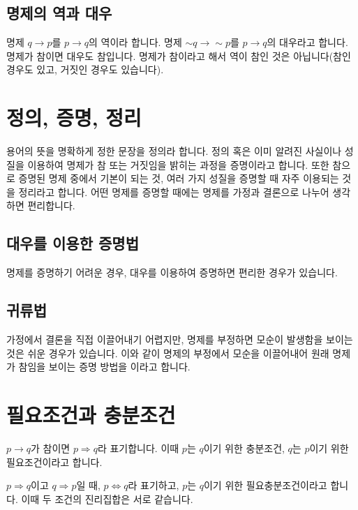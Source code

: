 \subsection{명제의 역과 대우}
명제 $q \longrightarrow p$를 $p \longrightarrow q$의 역이라 합니다. 명제 $\sim q \longrightarrow \sim p$를 $p \longrightarrow q$의 대우라고 합니다. 명제가 참이면 대우도 참입니다. 명제가 참이라고 해서 역이 참인 것은 아닙니다(참인 경우도 있고, 거짓인 경우도 있습니다).

\section{정의, 증명, 정리}
용어의 뜻을 명확하게 정한 문장을 정의라 합니다. 정의 혹은 이미 알려진 사실이나 성질을 이용하여 명제가 참 또는 거짓임을 밝히는 과정을 증명이라고 합니다. 또한 참으로 증명된 명제 중에서 기본이 되는 것, 여러 가지 성질을 증명할 때 자주 이용되는 것을 정리라고 합니다. 어떤 명제를 증명할 때에는 명제를 가정과 결론으로 나누어 생각하면 편리합니다.

\subsection{대우를 이용한 증명법}
명제를 증명하기 어려운 경우, 대우를 이용하여 증명하면 편리한 경우가 있습니다.

\subsection{귀류법}
가정에서 결론을 직접 이끌어내기 어렵지만, 명제를 부정하면 모순이 발생함을 보이는 것은 쉬운 경우가 있습니다. 이와 같이 명제의 부정에서 모순을 이끌어내어 원래 명제가 참임을 보이는 증명 방법을 이라고 합니다.

\section{필요조건과 충분조건}
$p \longrightarrow q$가 참이면 $p \Longrightarrow q$라 표기합니다. 이때 $p$는 $q$이기 위한 충분조건, $q$는 $p$이기 위한 필요조건이라고 합니다. 

$p \Longrightarrow q$이고 $q \Longrightarrow p$일 때, $p \Longleftrightarrow q$라 표기하고, $p$는 $q$이기 위한 필요충분조건이라고 합니다. 이때 두 조건의 진리집합은 서로 같습니다. 



